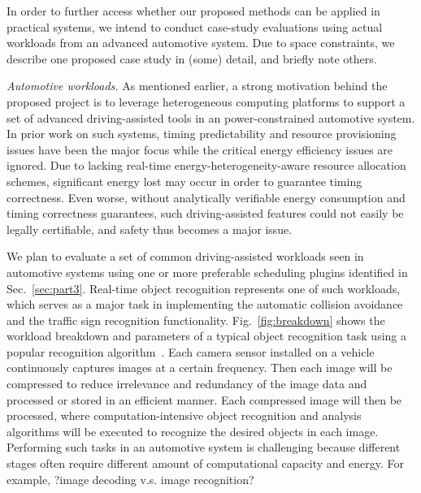 In order to further access whether our proposed methods can be applied in practical systems, we intend to conduct case-study evaluations using actual workloads from an advanced automotive system. Due to space constraints, we describe one proposed case study in (some) detail, and briefly note others.

\textit{Automotive workloads.} As mentioned earlier, a strong motivation behind the proposed project is to leverage heterogeneous computing platforms to support a set of advanced driving-assisted tools in an power-constrained automotive system. In prior work on such systems, timing predictability and resource provisioning issues have been the major focus while the critical energy efficiency issues are ignored. Due to lacking real-time energy-heterogeneity-aware resource allocation schemes, significant energy lost may occur in order to guarantee timing correctness. Even worse, without analytically verifiable energy consumption and timing correctness guarantees, such driving-assisted features could not easily be legally certifiable, and safety thus becomes a major issue. 


We plan to evaluate a set of common driving-assisted workloads seen in automotive systems using one or more preferable scheduling plugins identified in Sec.~\ref{sec:part3}. Real-time object recognition represents one of such workloads, which serves as a major task in implementing the automatic collision avoidance and the traffic sign recognition functionality. Fig.~\ref{fig:breakdown} shows the workload breakdown and parameters of a typical object recognition task using a popular recognition algorithm~\cite{?}.   
Each camera sensor installed on a vehicle continuously captures images at a certain frequency. Then each image will be compressed to reduce irrelevance and redundancy of the image data and processed or stored in an efficient manner. Each compressed image will then be processed, where computation-intensive object recognition and analysis algorithms will be executed to recognize the desired objects in each image. Performing such tasks in an automotive system is challenging because different stages often require different amount of computational capacity and energy. For example, ?image decoding v.s. image recognition?

